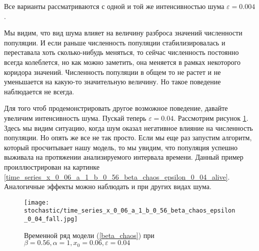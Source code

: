         Все варианты рассматриваются с одной и той же интенсивностью шума \(\varepsilon = 0.004\). 
        
        Мы видим, что вид шума влияет на величину разброса значений численности популяции.  И если раньше численность популяции стабилизировалась и переставала хоть сколько-нибудь меняться, то сейчас численность постоянно всегда колеблется, но как можно заметить, она меняется в рамках некоторого коридора значений. Численность популяции в общем то не растет и не уменьшается на какую-то значительную величину. Но такое поведение наблюдается не всегда.




        Для того чтоб продемонстрировать другое возможное поведение, давайте увеличим интенсивность шума. Пускай теперь \(\varepsilon = 0.04\). Рассмотрим рисунок \ref{time_series_x_0_06_a_1_b_0_56_beta_chaos_epsilon_0_04_fall}. Здесь мы видим ситуацию, когда шум оказал негативное влияние на численность популяции. Но опять же все не так просто. Если мы еще раз запустим алгоритм, который просчитывает нашу модель, то мы увидим, что популяция успешно выживала на протяжении анализируемого интервала времени. Данный пример проиллюстрирован на картинке \ref{time_series_x_0_06_a_1_b_0_56_beta_chaos_epsilon_0_04_alive}. Аналогичные эффекты можно наблюдать и при других видах шума.


        \begin{figure}
            \centering
            \texttt{[image: stochastic/time\_series\_x\_0\_06\_a\_1\_b\_0\_56\_beta\_chaos\_epsilon\_0\_04\_fall.jpg]}
        
            \captionsetup{justification=centering}
            \caption{Временной ряд модели (\ref{beta_chaos}) при \(\beta = 0.56, \alpha = 1, x_0 = 0.06, \varepsilon = 0.04\)}
            \label{time_series_x_0_06_a_1_b_0_56_beta_chaos_epsilon_0_04_fall}
        \end{figure}

